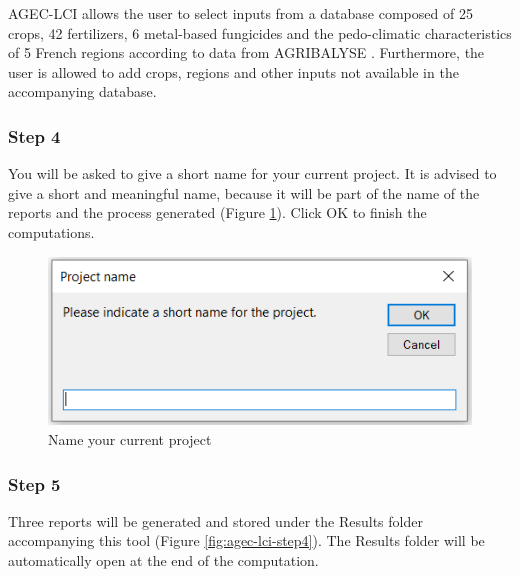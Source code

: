 \documentclass[openany]{book}
\begin{document}
AGEC-LCI allows the user to select inputs from a database composed of 25 crops, 42 fertilizers, 6 metal-based fungicides and the pedo-climatic characteristics of 5 French regions according to data from AGRIBALYSE \citep{Koch2015}. Furthermore, the user is allowed to add crops, regions and other inputs not available in the accompanying database.

\hypertarget{step-4}{%
\subsubsection*{Step 4}\label{step-4}}

You will be asked to give a short name for your current project. It is advised to give a short and meaningful name, because it will be part of the name of the reports and the process generated (Figure \ref{fig:agec-lci-step3}). Click OK to finish the computations.

\begin{figure}[ht]

{\centering \includegraphics[width=6.76in]{Figures/agec_lci_step3} 

}

\caption{Name your current project}\label{fig:agec-lci-step3}
\end{figure}

\hypertarget{step-5}{%
\subsubsection*{Step 5}\label{step-5}}

Three reports will be generated and stored under the Results folder accompanying this tool (Figure \ref{fig:agec-lci-step4}). The Results folder will be automatically open at the end of the computation.
\end{document}
